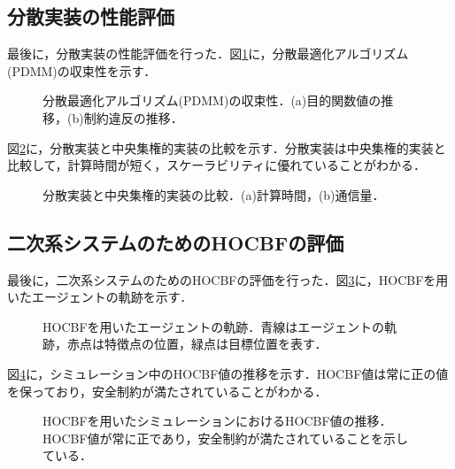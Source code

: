 \subsection{分散実装の性能評価}

最後に，分散実装の性能評価を行った．図\ref{fig:distributed_convergence}に，分散最適化アルゴリズム(PDMM)の収束性を示す．

\begin{figure}[htbp]
    \centering
    \caption{分散最適化アルゴリズム(PDMM)の収束性．(a)目的関数値の推移，(b)制約違反の推移．}
    \label{fig:distributed_convergence}
\end{figure}

図\ref{fig:distributed_vs_centralized}に，分散実装と中央集権的実装の比較を示す．分散実装は中央集権的実装と比較して，計算時間が短く，スケーラビリティに優れていることがわかる．

\begin{figure}[htbp]
    \centering
    \caption{分散実装と中央集権的実装の比較．(a)計算時間，(b)通信量．}
    \label{fig:distributed_vs_centralized}
\end{figure}

\subsection{二次系システムのためのHOCBFの評価}

最後に，二次系システムのためのHOCBFの評価を行った．図\ref{fig:hocbf_trajectory}に，HOCBFを用いたエージェントの軌跡を示す．

\begin{figure}[htbp]
    \centering
    \caption{HOCBFを用いたエージェントの軌跡．青線はエージェントの軌跡，赤点は特徴点の位置，緑点は目標位置を表す．}
    \label{fig:hocbf_trajectory}
\end{figure}

図\ref{fig:hocbf_cbf_value}に，シミュレーション中のHOCBF値の推移を示す．HOCBF値は常に正の値を保っており，安全制約が満たされていることがわかる．

\begin{figure}[htbp]
    \centering
    \caption{HOCBFを用いたシミュレーションにおけるHOCBF値の推移．HOCBF値が常に正であり，安全制約が満たされていることを示している．}
    \label{fig:hocbf_cbf_value}
\end{figure}

